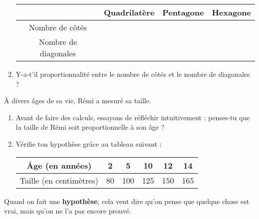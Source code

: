 \documentclass[a4paper,11pt]{article}
\begin{document}
\begin{exercice}
\begin{enumerate}
		      \begin{tabular}{|c|c|c|c|}
			      \hline
			                                                 & \cellcolor{lightgray} Quadrilatère & \cellcolor{lightgray} Pentagone & \cellcolor{lightgray}  Hexagone \\ \hline
			      \cellcolor{lightgray} Nombre de côtés      &                                    &                                 &                                 \\ \hline
			      \cellcolor{lightgray} Nombre de diagonales &                                    &                                 &                                 \\ \hline
		      \end{tabular}
		\item Y-a-t'il proportionnalité entre le nombre de côtés et le nombre de diagonales ?
	\end{enumerate}
\end{exercice}

\vspace{1.5em}

\begin{exercice}
	À divers âges de sa vie, Rémi a mesuré sa taille.

	\begin{enumerate}
		\item Avant de faire des calculs, essayons de réfléchir intuitivement : penses-tu que la taille de Rémi soit proportionnelle à son âge ?
		\item Vérifie ton hypothèse grâce au tableau suivant :

		      \begin{tabular}{|c|c|c|c|c|c|}
			      \hline
			      \cellcolor{lightgray} Âge (en années)         & 2  & 5   & 10  & 12  & 14  \\ \hline
			      \cellcolor{lightgray} Taille (en centimètres) & 80 & 100 & 125 & 150 & 165 \\ \hline
		      \end{tabular}
	\end{enumerate}

	\begin{vocabulaire}[Hypothèse]
		Quand on fait une \textbf{hypothèse}, cela veut dire qu'on pense que quelque chose est vrai, mais qu'on ne l'a pas encore prouvé.
	\end{vocabulaire}
\end{exercice}
\end{document}
